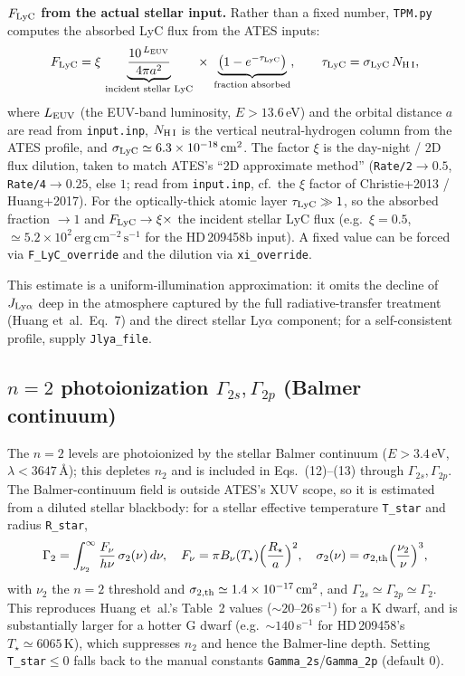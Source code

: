 \documentclass[english,a4paper]{kiseon_memo}
\begin{document}
\textbf{$F_{\rm LyC}$ from the actual stellar input.} Rather than a fixed
number, \texttt{TPM.py} computes the absorbed LyC flux from the ATES
inputs:
\[
  F_{\rm LyC} = \xi\,
  \underbrace{\frac{10^{\,L_{\rm EUV}}}{4\pi a^2}}_{\text{incident stellar LyC}}
  \;\times\;\underbrace{\bigl(1-e^{-\tau_{\rm LyC}}\bigr)}_{\text{fraction absorbed}},
  \qquad
  \tau_{\rm LyC} = \sigma_{\rm LyC}\,N_{\rm H\,I},
\]
where $L_{\rm EUV}$ (the EUV-band luminosity, $E>13.6$\,eV) and the
orbital distance $a$ are read from \texttt{input.inp}, $N_{\rm H\,I}$ is
the vertical neutral-hydrogen column from the ATES profile, and
$\sigma_{\rm LyC}\simeq6.3\times10^{-18}\,\mathrm{cm^2}$. The factor
$\xi$ is the day-night / 2D flux dilution, taken to match ATES's ``2D
approximate method'' (\texttt{Rate/2}$\to0.5$, \texttt{Rate/4}$\to0.25$,
else $1$; read from \texttt{input.inp}, cf.\ the $\xi$ factor of
Christie+2013 / Huang+2017). For the optically-thick atomic layer
$\tau_{\rm LyC}\gg1$, so the absorbed fraction $\to1$ and
$F_{\rm LyC}\to\xi\times$ the incident stellar LyC flux (e.g.\
$\xi=0.5$, $\simeq5.2\times10^{2}\,\mathrm{erg\,cm^{-2}\,s^{-1}}$ for the
HD\,209458b input). A fixed value can be forced via
\texttt{F\_LyC\_override} and the dilution via \texttt{xi\_override}.

This estimate is a uniform-illumination approximation: it omits the
decline of $J_{\rm Ly\alpha}$ deep in the atmosphere captured by the full
radiative-transfer treatment (Huang et~al.\ Eq.~7) and the direct stellar
Ly$\alpha$ component; for a self-consistent profile, supply
\texttt{Jlya\_file}.

\subsection{$n=2$ photoionization $\Gamma_{2s},\Gamma_{2p}$ (Balmer continuum)}
\label{sec:gamma2}

The $n=2$ levels are photoionized by the stellar Balmer continuum
($E>3.4$\,eV, $\lambda<3647$\,\AA{}); this depletes $n_2$ and is included
in Eqs.~(12)--(13) through $\Gamma_{2s},\Gamma_{2p}$. The Balmer-continuum
field is outside ATES's XUV scope, so it is estimated from a diluted
stellar blackbody: for a stellar effective temperature \texttt{T\_star}
and radius \texttt{R\_star},
\[
  \Gamma_2 = \int_{\nu_2}^{\infty}\frac{F_\nu}{h\nu}\,\sigma_2(\nu)\,d\nu,
  \quad F_\nu = \pi B_\nu(T_\star)\Bigl(\frac{R_\star}{a}\Bigr)^2,
  \quad \sigma_2(\nu)=\sigma_{2,\rm th}\Bigl(\frac{\nu_2}{\nu}\Bigr)^{3},
\]
with $\nu_2$ the $n=2$ threshold and $\sigma_{2,\rm th}\simeq1.4\times
10^{-17}\,\mathrm{cm^2}$, and $\Gamma_{2s}\simeq\Gamma_{2p}\simeq\Gamma_2$.
This reproduces Huang et~al.'s Table~2 values ($\sim20$--$26\,$s$^{-1}$)
for a K dwarf, and is substantially larger for a hotter G dwarf
(e.g.\ $\sim140\,$s$^{-1}$ for HD\,209458's $T_\star\simeq6065\,$K), which
suppresses $n_2$ and hence the Balmer-line depth. Setting
\texttt{T\_star}$\le0$ falls back to the manual constants
\texttt{Gamma\_2s}/\texttt{Gamma\_2p} (default $0$).
\end{document}
